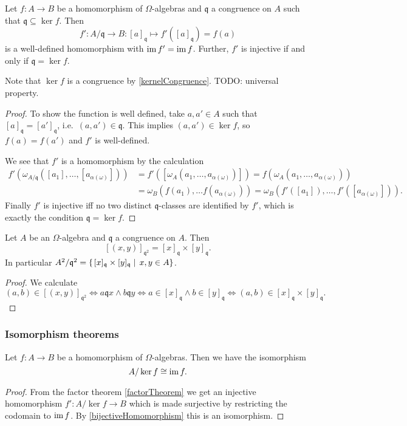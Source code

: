 \begin{proposition} \label{factorTheorem}
Let $f:A\to B$ be a homomorphism of $\Omega$-algebras and $\mathfrak{q}$ a congruence on $A$ such that $\mathfrak{q}\subseteq \ker f$. Then
\[ f': A/\mathfrak{q} \to B: [a]_\mathfrak{q} \mapsto f'([a]_\mathfrak{q}) = f(a) \]
is a well-defined homomorphism with $\operatorname{im} f' = \operatorname{im} f$. Further, $f'$ is injective \textup{if and only if} $\mathfrak{q} = \ker f$.
\end{proposition}
Note that $\ker f$ is a congruence by \ref{kernelCongruence}. TODO: universal property.
\begin{proof}
To show the function is well defined, take $a,a'\in A$ such that $[a]_\mathfrak{q} = [a']_\mathfrak{q}$, i.e.\ $(a,a')\in \mathfrak{q}$. This implies $(a,a')\in\ker f$, so $f(a) = f(a')$ and $f'$ is well-defined.

We see that $f'$ is a homomorphism by the calculation
\begin{align*}
f'(\omega_{A/\mathfrak{q}}([a_1], \ldots, [a_{\alpha(\omega)}])) &= f'([\omega_{A}(a_1, \ldots, a_{\alpha(\omega)})]) = f(\omega_{A}(a_1, \ldots, a_{\alpha(\omega)})) \\
&= \omega_B(f(a_1), \ldots f(a_{\alpha(\omega)})) = \omega_B(f'([a_1]), \ldots, f'([a_{\alpha(\omega)}])).
\end{align*}
Finally $f'$ is injective iff no two distinct $\mathfrak{q}$-classes are identified by $f'$, which is exactly the condition $\mathfrak{q} = \ker f$.
\end{proof}

\begin{lemma}
Let $A$ be an $\Omega$-algebra and $\mathfrak{q}$ a congruence on $A$. Then
\[ [(x,y)]_{\mathfrak{q}^2} = [x]_\mathfrak{q}\times [y]_\mathfrak{q}. \]
In particular $A^2/\mathfrak{q}^2 = \left\{\left. [x]_\mathfrak{q}\times [y]_\mathfrak{q} \;\right|\; x,y\in A \right\}$.
\end{lemma}
\begin{proof}
We calculate
\[ (a,b) \in [(x,y)]_{\mathfrak{q}^2} \iff a\mathfrak{q}x \land b\mathfrak{q}y \iff a\in [x]_\mathfrak{q} \land b\in [y]_\mathfrak{q} \iff (a,b)\in [x]_\mathfrak{q}\times [y]_\mathfrak{q}. \]
\end{proof}

\subsubsection{Isomorphism theorems}
\begin{theorem} \label{firstIsomorphism}
Let $f:A\to B$ be a homomorphism of $\Omega$-algebras. Then we have the isomorphism
\[ A/\ker f \cong \operatorname{im} f. \]
\end{theorem}
\begin{proof}
From the factor theorem \ref{factorTheorem} we get an injective homomorphism $f': A/\ker f \to B$ which is made surjective by restricting the codomain to $\operatorname{im} f$. By \ref{bijectiveHomomorphism} this is an isomorphism.
\end{proof}

